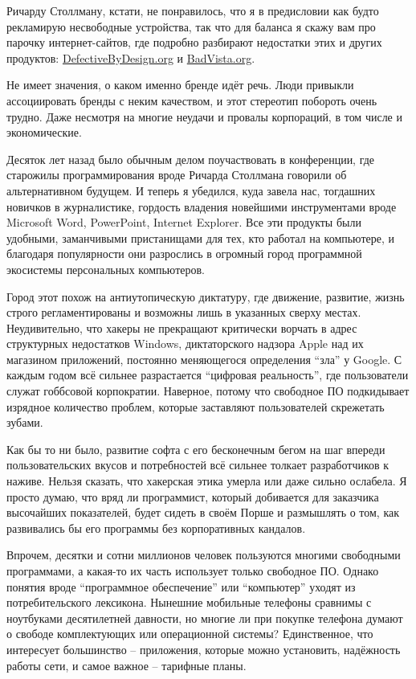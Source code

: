 Ричарду Столлману, кстати, не понравилось, что я в предисловии как будто
рекламирую несвободные устройства, так что для баланса я скажу
вам про парочку интернет-сайтов, где подробно разбирают недостатки
этих и других продуктов:  \url{DefectiveByDesign.org} и \url{BadVista.org}.

Не имеет значения, о каком именно бренде идёт речь. Люди привыкли
ассоциировать бренды с неким качеством, и этот стереотип побороть
очень трудно. Даже несмотря на многие неудачи и провалы корпораций,
в том числе и экономические.

Десяток лет назад было обычным делом поучаствовать в конференции,
где старожилы программирования вроде Ричарда Столлмана говорили
об альтернативном будущем. И теперь я убедился, куда завела нас,
тогдашних новичков в журналистике, гордость владения новейшими
инструментами вроде Microsoft Word, PowerPoint, Internet Explorer. Все
эти продукты были удобными, заманчивыми пристанищами для тех, кто
работал на компьютере, и благодаря популярности они разрослись в
огромный город программной экосистемы персональных компьютеров.

Город этот похож на антиутопическую диктатуру, где движение, развитие,
жизнь строго регламентированы и возможны лишь в указанных сверху
местах. Неудивительно, что хакеры не прекращают критически ворчать
в адрес структурных недостатков Windows, диктаторского надзора Apple
над их магазином приложений, постоянно меняющегося определения \enquote{зла}
у Google. С каждым годом всё сильнее разрастается \enquote{цифровая реальность},
где пользователи служат гоббсовой корпократии. Наверное, потому что
свободное ПО подкидывает изрядное количество проблем, которые
заставляют пользователей скрежетать зубами.

Как бы то ни было, развитие софта с его бесконечным бегом на шаг
впереди пользовательских вкусов и потребностей всё сильнее толкает
разработчиков к наживе. Нельзя сказать, что хакерская этика умерла или
даже сильно ослабела. Я просто думаю, что вряд ли программист,
который добивается для заказчика высочайших показателей, будет
сидеть в своём Порше и размышлять о том, как развивались бы его
программы без корпоративных кандалов.

Впрочем, десятки и сотни миллионов человек пользуются многими
свободными программами, а какая-то их часть использует только
свободное ПО. Однако понятия вроде \enquote{программное обеспечение}
или \enquote{компьютер} уходят из потребительского лексикона. Нынешние
мобильные телефоны сравнимы с ноутбуками десятилетней давности,
но многие ли при покупке телефона думают о свободе комплектующих
или операционной системы? Единственное, что интересует большинство
-- приложения, которые можно установить, надёжность работы сети, и
самое важное -- тарифные планы.

